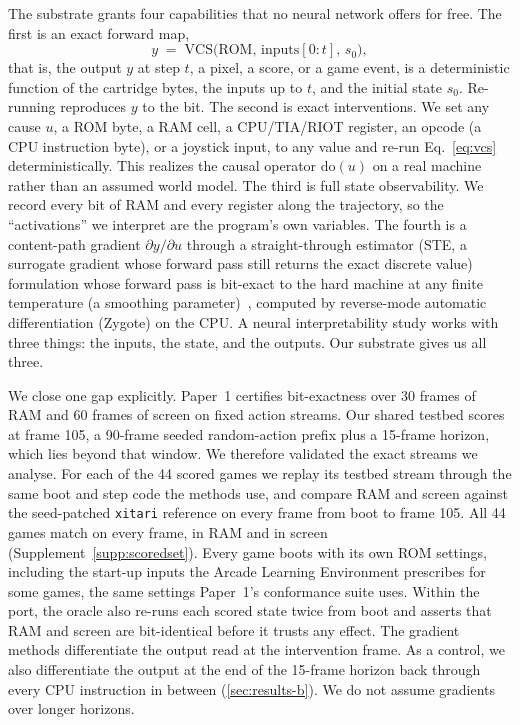 The substrate grants four capabilities that no neural network offers for free. The first is
an exact forward map,
\begin{equation}
  y \;=\; \mathrm{VCS}\big(\mathrm{ROM},\, \mathrm{inputs}[0{:}t],\, s_0\big),
  \label{eq:vcs}
\end{equation}
that is, the output $y$ at step $t$, a pixel, a score, or a game event, is a deterministic
function of the cartridge bytes, the inputs up to $t$, and the initial state $s_0$. Re-running
reproduces $y$ to the bit. The second is exact interventions. We set any cause
$u$, a ROM byte, a RAM cell, a CPU/TIA/RIOT register, an opcode (a CPU instruction byte), or a joystick input, to any
value and re-run Eq.~\eqref{eq:vcs} deterministically. This realizes the causal operator
$\mathrm{do}(u)$ on a real machine rather than an assumed world model. The third is full
state observability. We record every bit of RAM and every register along the trajectory, so
the ``activations'' we interpret are the program's own variables. The fourth is a
content-path gradient $\partial y / \partial u$ through a straight-through estimator (STE,
a surrogate gradient whose forward pass still returns the exact discrete value)
formulation whose forward pass is bit-exact to the hard machine at any finite
temperature (a smoothing parameter)~\cite{bengio2013estimating,jang2017gumbel}, computed by
reverse-mode automatic differentiation (Zygote) on the CPU. A neural
interpretability study works with three things: the inputs, the state, and the outputs. Our
substrate gives us all three.

We close one gap explicitly. Paper~1 certifies bit-exactness over 30 frames of RAM and 60
frames of screen on fixed action streams. Our shared testbed scores at frame 105, a 90-frame
seeded random-action prefix plus a 15-frame horizon, which lies beyond that window. We therefore
validated the exact streams we analyse. For each of the 44 scored games we replay its testbed
stream through the same boot and step code the methods use, and compare RAM and screen against
the seed-patched \texttt{xitari} reference on every frame from boot to frame 105. All 44 games
match on every frame, in RAM and in screen (Supplement~\ref{supp:scoredset}). Every game boots
with its own ROM settings, including the start-up inputs the Arcade Learning Environment
prescribes for some games, the same settings Paper~1's conformance suite uses. Within the port,
the oracle also re-runs each scored state twice from boot and asserts that RAM and screen are
bit-identical before it trusts any effect. The gradient methods differentiate the output read at the
intervention frame. As a control, we also differentiate the output at the end of the 15-frame
horizon back through every CPU instruction in between (\Sectionname\ref{sec:results-b}). We do
not assume gradients over longer horizons.

